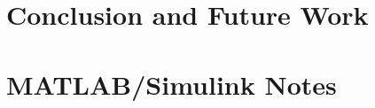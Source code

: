 \documentclass[12pt,a4paper]{report}
\begin{document}
% 

% 

\chapter{Conclusion and Future Work}


\clearpage


\appendix
\chapter{MATLAB/Simulink Notes}

\end{document}
